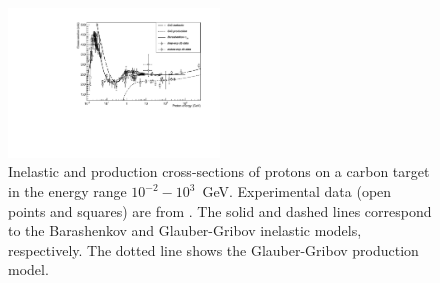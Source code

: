 \begin{figure}
\includegraphics[width=0.5\textwidth]{figures/pCinprodBGG.pdf}
\caption{ Inelastic and production cross-sections of protons on a carbon 
target in the energy range $10^{-2}-10^3$~GeV. Experimental data (open points
and squares) are from \cite{hadbib:ihepbase,hadbib:dubnabase}. The solid and 
dashed lines correspond to the Barashenkov and Glauber-Gribov inelastic models,
respectively.  The dotted line shows the Glauber-Gribov production model.}
\label{pCinprodBGG}
\end{figure}



